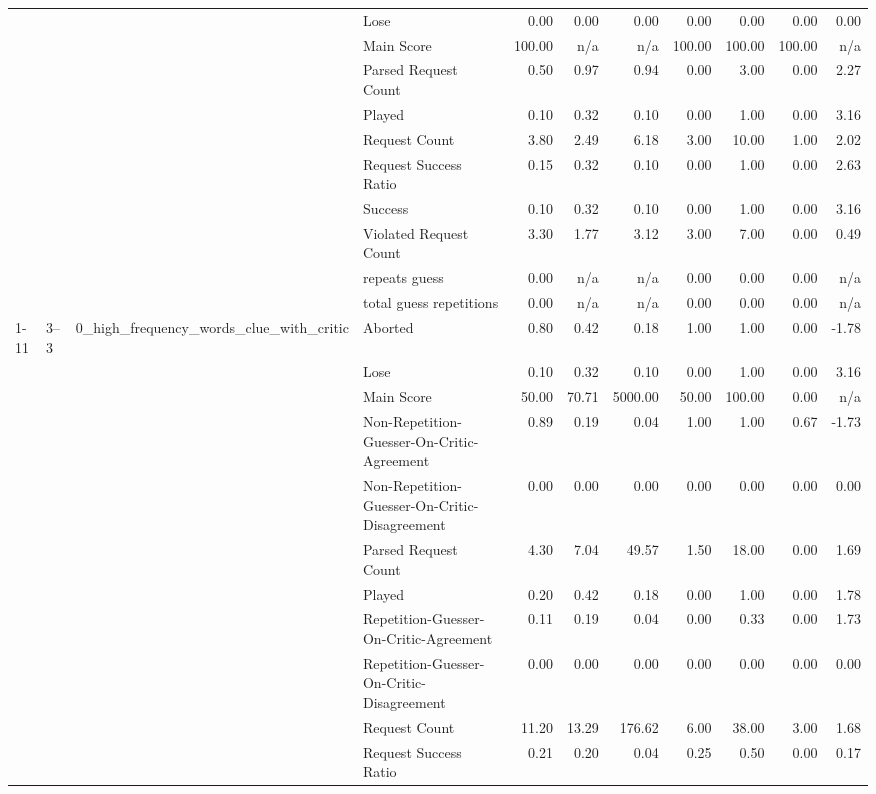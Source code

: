 \begin{tabular}{llllrrrrrrr}
 &  &  & Lose & 0.00 & 0.00 & 0.00 & 0.00 & 0.00 & 0.00 & 0.00 \\
 &  &  & Main Score & 100.00 & n/a & n/a & 100.00 & 100.00 & 100.00 & n/a \\
 &  &  & Parsed Request Count & 0.50 & 0.97 & 0.94 & 0.00 & 3.00 & 0.00 & 2.27 \\
 &  &  & Played & 0.10 & 0.32 & 0.10 & 0.00 & 1.00 & 0.00 & 3.16 \\
 &  &  & Request Count & 3.80 & 2.49 & 6.18 & 3.00 & 10.00 & 1.00 & 2.02 \\
 &  &  & Request Success Ratio & 0.15 & 0.32 & 0.10 & 0.00 & 1.00 & 0.00 & 2.63 \\
 &  &  & Success & 0.10 & 0.32 & 0.10 & 0.00 & 1.00 & 0.00 & 3.16 \\
 &  &  & Violated Request Count & 3.30 & 1.77 & 3.12 & 3.00 & 7.00 & 0.00 & 0.49 \\
 &  &  & repeats guess & 0.00 & n/a & n/a & 0.00 & 0.00 & 0.00 & n/a \\
 &  &  & total guess repetitions & 0.00 & n/a & n/a & 0.00 & 0.00 & 0.00 & n/a \\
\cline{1-11} \cline{2-11} \cline{3-11}
\multirow[t]{495}{*}{wordle_withcritic} & \multirow[t]{45}{*}{3--3} & \multirow[t]{15}{*}{0_high_frequency_words_clue_with_critic} & Aborted & 0.80 & 0.42 & 0.18 & 1.00 & 1.00 & 0.00 & -1.78 \\
 &  &  & Lose & 0.10 & 0.32 & 0.10 & 0.00 & 1.00 & 0.00 & 3.16 \\
 &  &  & Main Score & 50.00 & 70.71 & 5000.00 & 50.00 & 100.00 & 0.00 & n/a \\
 &  &  & Non-Repetition-Guesser-On-Critic-Agreement & 0.89 & 0.19 & 0.04 & 1.00 & 1.00 & 0.67 & -1.73 \\
 &  &  & Non-Repetition-Guesser-On-Critic-Disagreement & 0.00 & 0.00 & 0.00 & 0.00 & 0.00 & 0.00 & 0.00 \\
 &  &  & Parsed Request Count & 4.30 & 7.04 & 49.57 & 1.50 & 18.00 & 0.00 & 1.69 \\
 &  &  & Played & 0.20 & 0.42 & 0.18 & 0.00 & 1.00 & 0.00 & 1.78 \\
 &  &  & Repetition-Guesser-On-Critic-Agreement & 0.11 & 0.19 & 0.04 & 0.00 & 0.33 & 0.00 & 1.73 \\
 &  &  & Repetition-Guesser-On-Critic-Disagreement & 0.00 & 0.00 & 0.00 & 0.00 & 0.00 & 0.00 & 0.00 \\
 &  &  & Request Count & 11.20 & 13.29 & 176.62 & 6.00 & 38.00 & 3.00 & 1.68 \\
 &  &  & Request Success Ratio & 0.21 & 0.20 & 0.04 & 0.25 & 0.50 & 0.00 & 0.17 \\

\end{tabular}
